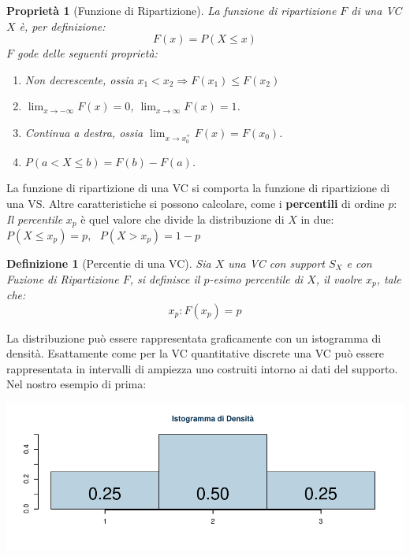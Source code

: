 \documentclass[
  11pt,
]{book}
\providecommand{\tightlist}{%
  \setlength{\itemsep}{0pt}\setlength{\parskip}{0pt}}
\theoremstyle{mytheoremstyle}
\newtheorem{proposition}{Proprietà}[section]
\theoremstyle{mydefstyle}
\newtheorem{definition}{Definizione}[section]
\begin{document}
\begin{info}

\begin{proposition}[Funzione di Ripartizione]

La funzione di ripartizione \(F\) di una VC \(X\) è, per definizione:
\[F(x)=P(X\leq x)\]
\(F\) gode delle seguenti proprietà:

\begin{enumerate}
\def\labelenumi{\arabic{enumi}.}
\tightlist
\item
  Non decrescente, ossia \(x_{1}<x_{2} \Rightarrow F(x_{1}) \le F(x_{2})\)
\item
  \(\lim_{x\to -\infty} F(x) = 0\), \qquad \(\lim_{x\to\infty} F(x) = 1\).
\item
  Continua a destra, ossia \(\lim_{x\to x_{0}^{+}} F(x) = F(x_{0})\).
\item
  \(P(a < X \le b) = F(b) - F(a)\).
\end{enumerate}

\end{proposition}

\end{info}

La funzione di ripartizione di una VC si comporta la funzione di ripartizione di
una VS.
Altre caratteristiche si possono calcolare, come i \textbf{percentili} di ordine \(p\):
\emph{Il percentile} \(x_p\) è quel valore che divide la distribuzione di \(X\) in due:
\(P(X\le x_p)=p,~~~P(X>x_p)=1-p\)

\begin{info}

\begin{definition}[Percentie di una VC]
Sia \(X\) una VC con support \(S_X\) e con Fuzione di Ripartizione \(F\), si definisce il \(p\)-esimo percentile di \(X\), il vaolre \(x_p\), tale che:
\[
x_p:F(x_p)=p
\]
\end{definition}

\end{info}

La distribuzione può essere rappresentata graficamente con un istogramma di densità.
Esattamente come per la VC quantitative discrete una VC può essere rappresentata
in intervalli di ampiezza uno costruiti intorno ai dati del supporto.
Nel nostro esempio di prima:

\begin{center}\includegraphics{Appunti_di_Statistica_2025_files/figure-latex/06-Variabili-Casuali-1-1} \end{center}
\end{document}
